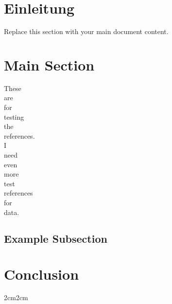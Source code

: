 \documentclass[12pt,a4paper]{article}
\newenvironment{longquote}
{%
    \setlength{\partopsep}{0pt}%
    \begin{adjustwidth}{2cm}{2cm}%
        \singlespacing
        \fontsize{10}{12}\selectfont
    }
{%
    \end{adjustwidth}%
}
\begin{document}

\onehalfspacing
\setlength{\parskip}{0.5\baselineskip}
\setlength{\parindent}{0pt}

\section{Einleitung}
Replace this section with your main document content.\autocite{schmidt_dengler_b}\par

\section{Main Section}
These\autocite{siegel2009}\\
are\autocite{kafka1996}\\
for\autocite{engel2010}\\
testing\autocite{valk2003}\\
the\autocite{nerad2003}\\
references.\autocite{speicher2010}\\
I\autocite{brittnacher}\\
need\autocite{kafka_strafkolonie}\\
even\autocite{beispiel_multiple_authors}\\
more\autocite{schmidt_dengler_a}\\
test\autocite{beispiel_multiple_editors}\\
references\autocite{schmidt_dengler_a}\\
for\autocite{schmidt_dengler_a}\\
data.\autocite{schmidt_dengler_b}\\

\subsection{Example Subsection}

\section{Conclusion}
\lipsum[1-2]

\begin{longquote}
\lipsum[3]
\end{longquote}

\lipsum[4]


\clearpage
\printbibliography[
    heading=bibintoc,
    title={Literaturverzeichnis}
]
\end{document}
